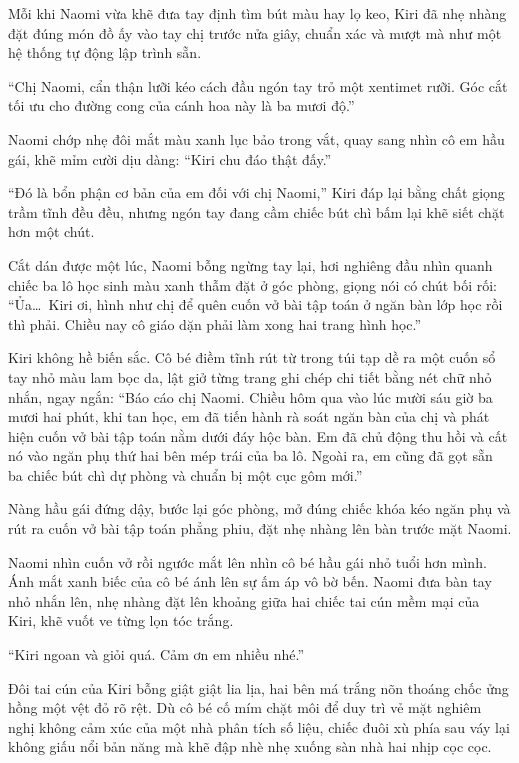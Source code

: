 \documentclass[../main.tex]{subfiles}
\begin{document}
Mỗi khi Naomi vừa khẽ đưa tay định tìm bút màu hay lọ keo, Kiri đã nhẹ nhàng đặt đúng món đồ ấy vào tay chị trước nửa giây, chuẩn xác và mượt mà như một hệ thống tự động lập trình sẵn.

``Chị Naomi, cẩn thận lưỡi kéo cách đầu ngón tay trỏ một xentimet rưỡi. Góc cắt tối ưu cho đường cong của cánh hoa này là ba mươi độ.''

Naomi chớp nhẹ đôi mắt màu xanh lục bảo trong vắt, quay sang nhìn cô em hầu gái, khẽ mỉm cười dịu dàng: ``Kiri chu đáo thật đấy.''

``Đó là bổn phận cơ bản của em đối với chị Naomi,'' Kiri đáp lại bằng chất giọng trầm tĩnh đều đều, nhưng ngón tay đang cầm chiếc bút chì bấm lại khẽ siết chặt hơn một chút.

Cắt dán được một lúc, Naomi bỗng ngừng tay lại, hơi nghiêng đầu nhìn quanh chiếc ba lô học sinh màu xanh thẫm đặt ở góc phòng, giọng nói có chút bối rối: ``Ủa\dots\ Kiri ơi, hình như chị để quên cuốn vở bài tập toán ở ngăn bàn lớp học rồi thì phải. Chiều nay cô giáo dặn phải làm xong hai trang hình học.''

Kiri không hề biến sắc. Cô bé điềm tĩnh rút từ trong túi tạp dề ra một cuốn sổ tay nhỏ màu lam bọc da, lật giở từng trang ghi chép chi tiết bằng nét chữ nhỏ nhắn, ngay ngắn: ``Báo cáo chị Naomi. Chiều hôm qua vào lúc mười sáu giờ ba mươi hai phút, khi tan học, em đã tiến hành rà soát ngăn bàn của chị và phát hiện cuốn vở bài tập toán nằm dưới đáy hộc bàn. Em đã chủ động thu hồi và cất nó vào ngăn phụ thứ hai bên mép trái của ba lô. Ngoài ra, em cũng đã gọt sẵn ba chiếc bút chì dự phòng và chuẩn bị một cục gôm mới.''

Nàng hầu gái đứng dậy, bước lại góc phòng, mở đúng chiếc khóa kéo ngăn phụ và rút ra cuốn vở bài tập toán phẳng phiu, đặt nhẹ nhàng lên bàn trước mặt Naomi.

Naomi nhìn cuốn vở rồi ngước mắt lên nhìn cô bé hầu gái nhỏ tuổi hơn mình. Ánh mắt xanh biếc của cô bé ánh lên sự ấm áp vô bờ bến. Naomi đưa bàn tay nhỏ nhắn lên, nhẹ nhàng đặt lên khoảng giữa hai chiếc tai cún mềm mại của Kiri, khẽ vuốt ve từng lọn tóc trắng.

``Kiri ngoan và giỏi quá. Cảm ơn em nhiều nhé.''

Đôi tai cún của Kiri bỗng giật giật lia lịa, hai bên má trắng nõn thoáng chốc ửng hồng một vệt đỏ rõ rệt. Dù cô bé cố mím chặt môi để duy trì vẻ mặt nghiêm nghị không cảm xúc của một nhà phân tích số liệu, chiếc đuôi xù phía sau váy lại không giấu nổi bản năng mà khẽ đập nhè nhẹ xuống sàn nhà hai nhịp cọc cọc.
\end{document}
